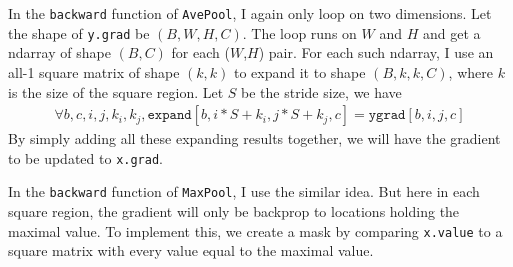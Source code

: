 \documentclass{article}
\begin{document}
In the \texttt{backward} function of \texttt{AvePool}, I again only loop on
two dimensions. Let the shape of \texttt{y.grad} be $(B, W, H, C)$. The loop
runs on $W$ and $H$ and get a ndarray of shape $(B,C)$ for each ($W$,$H$) pair.
For each such ndarray, I use an all-1 square matrix of shape $(k, k)$ to
expand it to shape $(B,k,k,C)$, where $k$ is the size of the square region. Let
$S$ be the stride size, we have 
\begin{align*}
\forall b, c, i, j, k_i, k_j,
\texttt{expand}[b, i * S + k_i, j * S + k_j, c] = \texttt{ygrad}[b,i,j,c]
\end{align*}
By simply adding all these expanding results together, we will have the gradient
to be updated to \texttt{x.grad}.

In the \texttt{backward} function of \texttt{MaxPool}, I use the similar
idea. But here in each square region, the gradient will only be backprop to
locations holding the maximal value. To implement this, we create a mask by
comparing \texttt{x.value} to a square matrix with every value equal to the
maximal value. 
\end{document}
